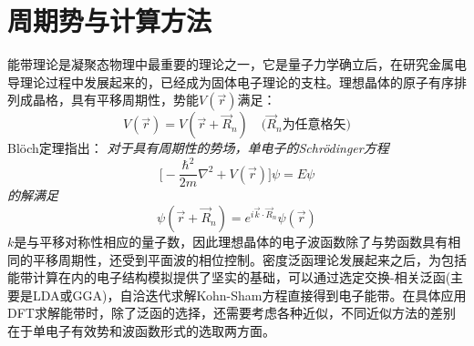 \chapter{周期势与计算方法}
能带理论是凝聚态物理中最重要的理论之一，它是量子力学确立后，在研究金属电导理论过程中发展起来的，已经成为固体电子理论的支柱。理想晶体的原子有序排列成晶格，具有平移周期性，势能$V(\vec r)$满足：
\begin{equation}\label{eq:solid-2}
	V(\vec r)=V(\vec r+\vec R_n)\quad\mbox{($\vec R_n$为任意格矢)}
\end{equation}
\textrm{Bl\"och}定理指出：
{\it 对于具有周期性的势场，单电子的Schr\"odinger方程}
\begin{equation}\label{eq:solid-1}
  \biggl[-\dfrac{\hbar^2}{2m}\nabla^2+V(\vec r)\biggr]\psi=E\psi
\end{equation}
{\it 的解满足}
\begin{equation}
  \psi(\vec r+\vec R_n)=e^{i\vec k\cdot\vec R_n}\psi(\vec r)
  \label{eq:bloch}
\end{equation}
$k$是与平移对称性相应的量子数，因此理想晶体的电子波函数除了与势函数具有相同的平移周期性，还受到平面波的相位控制。密度泛函理论发展起来之后，为包括能带计算在内的电子结构模拟提供了坚实的基础，可以通过选定交换-相关泛函(主要是LDA或GGA)，自洽迭代求解Kohn-Sham方程直接得到电子能带。在具体应用DFT求解能带时，除了泛函的选择，还需要考虑各种近似，不同近似方法的差别在于单电子有效势和波函数形式的选取两方面。

